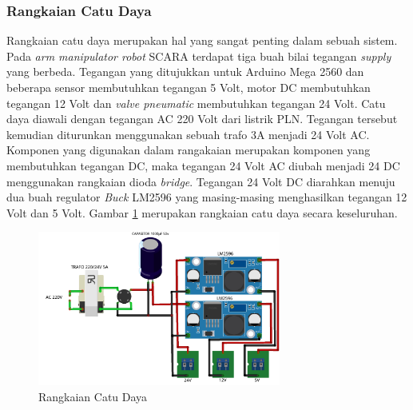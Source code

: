 \subsubsection{Rangkaian Catu Daya}
Rangkaian catu daya merupakan hal yang sangat penting dalam sebuah sistem. Pada \textit{arm manipulator robot} SCARA terdapat tiga buah bilai tegangan \textit{supply} yang berbeda. Tegangan yang ditujukkan untuk Arduino Mega 2560 dan beberapa sensor membutuhkan tegangan 5 Volt, motor DC membutuhkan tegangan 12 Volt dan \textit{valve pneumatic} membutuhkan tegangan 24 Volt. Catu daya diawali dengan tegangan AC 220 Volt dari listrik PLN. Tegangan tersebut kemudian diturunkan menggunakan sebuah trafo 3A menjadi 24 Volt AC. Komponen yang digunakan dalam rangakaian merupakan komponen yang membutuhkan tegangan DC, maka tegangan 24 Volt AC diubah menjadi 24 DC menggunakan rangkaian dioda \textit{bridge}. Tegangan 24 Volt DC diarahkan menuju dua buah regulator \textit{Buck} LM2596 yang masing-masing menghasilkan tegangan 12 Volt dan 5 Volt. Gambar \ref{pic.skematikcatu} merupakan rangkaian catu daya secara keseluruhan.
\begin{figure}[H]
	\centering
	\includegraphics[width=8cm]{gambar/catudaya_bb.png}
	\caption{Rangkaian Catu Daya}
	\label{pic.skematikcatu}
\end{figure}
